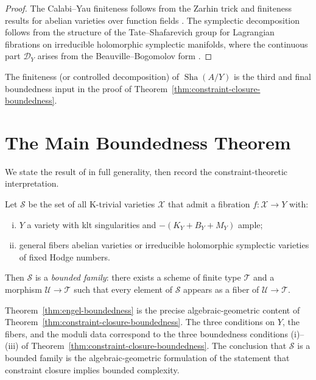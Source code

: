 \documentclass[11pt,openany]{book}
\newcommand{\Sha}{\operatorname{Sha}}
\begin{document}
\begin{proof}
The Calabi--Yau finiteness follows from the Zarhin trick
\citep{zarhin1977} and finiteness results for abelian
varieties over function fields
\citep{faltings1983,dolgachevgross1994}.  The symplectic
decomposition follows from the structure of the
Tate--Shafarevich group for Lagrangian fibrations on
irreducible holomorphic symplectic manifolds, where the
continuous part $\mathcal{D}_Y$ arises from the
Beauville--Bogomolov form \citep{beauville1983,huybrechts2003}.
\end{proof}

The finiteness (or controlled decomposition) of $\Sha(A/Y)$
is the third and final boundedness input in the proof of
Theorem~\ref{thm:constraint-closure-boundedness}.

\section{The Main Boundedness Theorem}
\label{sec:main-boundedness}

We state the result of \citet{engel2025} in full
generality, then record the constraint-theoretic
interpretation.

\begin{theorem}
\label{thm:engel-boundedness}
Let $\mathcal{S}$ be the set of all K-trivial varieties
$\mathcal{X}$ that admit a fibration
$f : \mathcal{X} \to Y$ with:
\begin{enumerate}[(i)]
  \item $Y$ a variety with klt singularities and
    $-(K_Y + B_Y + M_Y)$ ample;
  \item general fibers abelian varieties or irreducible
    holomorphic symplectic varieties of fixed Hodge
    numbers.
\end{enumerate}
Then $\mathcal{S}$ is a \emph{bounded family}: there exists
a scheme of finite type $\mathcal{T}$ and a morphism
$\mathcal{U} \to \mathcal{T}$ such that every element of
$\mathcal{S}$ appears as a fiber of $\mathcal{U} \to
\mathcal{T}$.
\end{theorem}

\begin{remark}
Theorem~\ref{thm:engel-boundedness} is the precise
algebraic-geometric content of
Theorem~\ref{thm:constraint-closure-boundedness}.
The three conditions on $Y$, the fibers, and the moduli
data correspond to the three boundedness conditions
(i)--(iii) of Theorem~\ref{thm:constraint-closure-boundedness}.
The conclusion that $\mathcal{S}$ is a bounded family
is the algebraic-geometric formulation of the statement
that constraint closure implies bounded complexity.
\end{remark}
\end{document}
